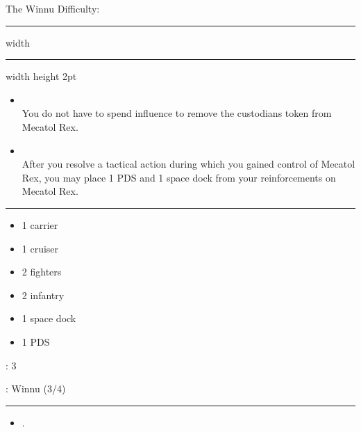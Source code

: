 {\handel\Huge The Winnu} \hfill {\Large Difficulty: \hard} \vspace{-4pt}\\
\hrule width \hsize \kern 1mm \hrule width \hsize height 2pt


\begin{multicols}{2}


\begin{itemize}
\item {}\\
You do not have to spend influence to remove the custodians token from Mecatol Rex.
\item {}\\
After you resolve a tactical action during which you gained control of Mecatol Rex, you may place 1 PDS and 1 space dock from your reinforcements on Mecatol Rex.
\end{itemize}


\vspace{-10pt}\rule{\hsize}{0.4pt}\vspace{5pt}


\vspace{-5pt}
\begin{multicols}{2}
\begin{itemize}
\item 1 carrier
\item 1 cruiser
\item 2 fighters
\item 2 infantry
\item 1 space dock
\item 1 PDS
\end{itemize}
\end{multicols}

\vspace{-5pt}
: 3

\vspace{2pt}
: Winnu (3/4)

\rule{\hsize}{0.4pt}\vspace{5pt}


\begin{itemize}
\item {}.
\end{itemize}


\end{multicols}
